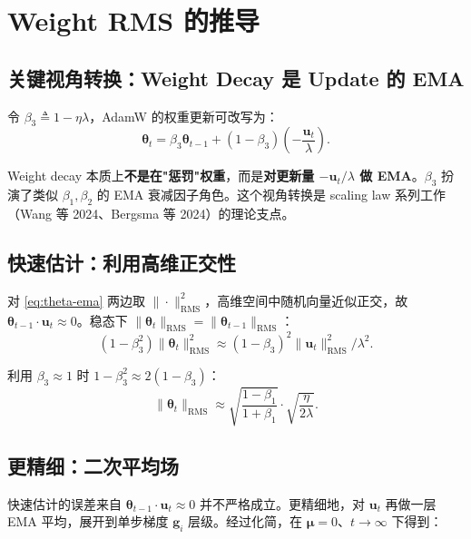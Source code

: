 \documentclass[11pt,a4paper]{ctexart}
\theoremstyle{definition}
\theoremstyle{remark}
\newcommand{\RMS}{\mathrm{RMS}}
\begin{document}
\section{Weight RMS 的推导}
 
\subsection{关键视角转换：Weight Decay 是 Update 的 EMA}
 
令 $\beta_3 \triangleq 1 - \eta\lambda$，AdamW 的权重更新可改写为：
\begin{equation}
\bm{\theta}_t = \beta_3 \bm{\theta}_{t-1} + (1-\beta_3)\!\left(-\frac{\bm{u}_t}{\lambda}\right).
\label{eq:theta-ema}
\end{equation}
 
\begin{keyinsight}
Weight decay 本质上\textbf{不是在"惩罚"权重}，而是\textbf{对更新量 $-\bm{u}_t/\lambda$ 做 EMA}。$\beta_3$ 扮演了类似 $\beta_1, \beta_2$ 的 EMA 衰减因子角色。这个视角转换是 scaling law 系列工作（Wang 等 2024、Bergsma 等 2024）的理论支点。
\end{keyinsight}
 
\subsection{快速估计：利用高维正交性}
 
对 \eqref{eq:theta-ema} 两边取 $\|\cdot\|_\RMS^2$，高维空间中随机向量近似正交，故 $\bm{\theta}_{t-1} \cdot \bm{u}_t \approx 0$。稳态下 $\|\bm{\theta}_t\|_\RMS = \|\bm{\theta}_{t-1}\|_\RMS$：
\begin{equation}
(1 - \beta_3^2) \|\bm{\theta}_t\|_\RMS^2 \approx (1-\beta_3)^2 \|\bm{u}_t\|_\RMS^2 / \lambda^2.
\end{equation}
 
利用 $\beta_3 \approx 1$ 时 $1 - \beta_3^2 \approx 2(1-\beta_3)$：
\begin{equation}
\|\bm{\theta}_t\|_\RMS \approx \sqrt{\frac{1-\beta_1}{1+\beta_1}} \cdot \sqrt{\frac{\eta}{2\lambda}}.
\label{eq:theta-fast}
\end{equation}
 
\subsection{更精细：二次平均场}
 
快速估计的误差来自 $\bm{\theta}_{t-1} \cdot \bm{u}_t \approx 0$ 并不严格成立。更精细地，对 $\bm{u}_t$ 再做一层 EMA 平均，展开到单步梯度 $\bm{g}_i$ 层级。经过化简，在 $\bm{\mu} = 0$、$t \to \infty$ 下得到：
 
\end{document}
